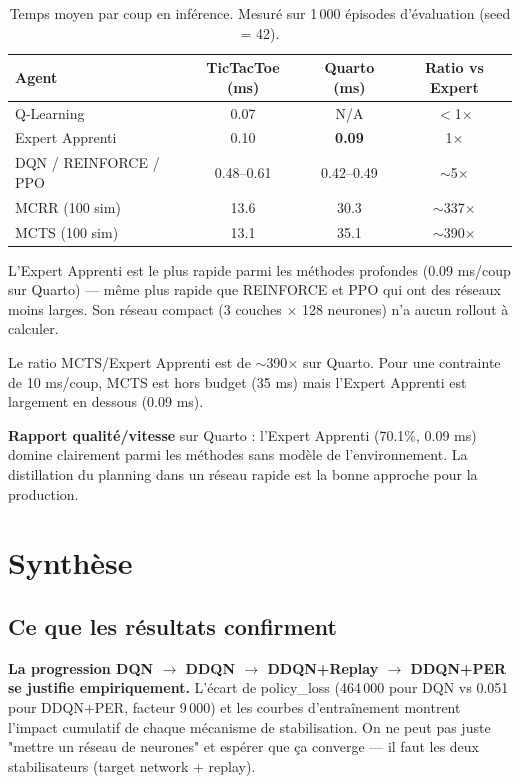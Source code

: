 \documentclass[12pt,a4paper]{article}
\begin{document}
\begin{table}[H]
\centering
\caption{Temps moyen par coup en inférence. Mesuré sur 1\,000 épisodes d'évaluation (seed = 42).}
\begin{tabular}{lccc}
\toprule
\textbf{Agent} & \textbf{TicTacToe (ms)} & \textbf{Quarto (ms)} & \textbf{Ratio vs Expert} \\
\midrule
Q-Learning & 0.07 & N/A & $<$1$\times$ \\
Expert Apprenti & 0.10 & \textbf{0.09} & 1$\times$ \\
DQN / REINFORCE / PPO & 0.48--0.61 & 0.42--0.49 & $\sim$5$\times$ \\
MCRR (100 sim) & 13.6 & 30.3 & $\sim$337$\times$ \\
MCTS (100 sim) & 13.1 & 35.1 & $\sim$390$\times$ \\
\bottomrule
\end{tabular}
\end{table}

L'Expert Apprenti est le plus rapide parmi les méthodes profondes (0.09 ms/coup sur Quarto) — même plus rapide que REINFORCE et PPO qui ont des réseaux moins larges. Son réseau compact (3 couches $\times$ 128 neurones) n'a aucun rollout à calculer.

Le ratio MCTS/Expert Apprenti est de $\sim$390$\times$ sur Quarto. Pour une contrainte de 10 ms/coup, MCTS est hors budget (35 ms) mais l'Expert Apprenti est largement en dessous (0.09 ms).

\textbf{Rapport qualité/vitesse} sur Quarto : l'Expert Apprenti (70.1\%, 0.09 ms) domine clairement parmi les méthodes sans modèle de l'environnement. La distillation du planning dans un réseau rapide est la bonne approche pour la production.

\section{Synthèse}

\subsection{Ce que les résultats confirment}

\textbf{La progression DQN $\to$ DDQN $\to$ DDQN+Replay $\to$ DDQN+PER se justifie empiriquement.} L'écart de policy\_loss (464\,000 pour DQN vs 0.051 pour DDQN+PER, facteur 9\,000) et les courbes d'entraînement montrent l'impact cumulatif de chaque mécanisme de stabilisation. On ne peut pas juste "mettre un réseau de neurones" et espérer que ça converge — il faut les deux stabilisateurs (target network + replay).
\end{document}
